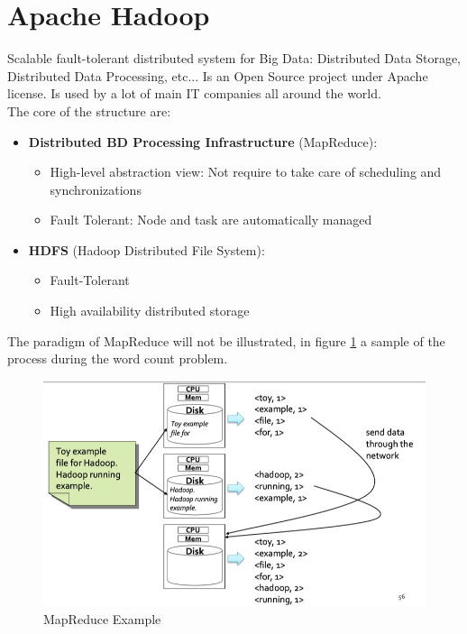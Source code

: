 \documentclass[12pt]{article}
\begin{document}
\section{Apache Hadoop}
Scalable fault-tolerant distributed system for Big Data: Distributed Data Storage, Distributed Data Processing, etc...
Is an Open Source project under Apache license. Is used by a lot of main IT companies all around the world.\\
The core of the structure are:
\begin{itemize}
  \item \textbf{Distributed BD Processing Infrastructure} (MapReduce):
  \begin{itemize}
    \item High-level abstraction view: Not require to take care of scheduling and synchronizations
    \item Fault Tolerant: Node and task are automatically managed
  \end{itemize}
  \item \textbf{HDFS} (Hadoop Distributed File System):
  \begin{itemize}
    \item Fault-Tolerant
    \item High availability distributed storage
  \end{itemize}
\end{itemize}
The paradigm of MapReduce will not be illustrated, in figure \ref{fig:mapreduce} a sample of the process during the word count problem.
\begin{figure}[H]
  \includegraphics[width=\linewidth]{images/mapreduce.png}
  \caption{MapReduce Example}
  \label{fig:mapreduce}
\end{figure}
\end{document}
